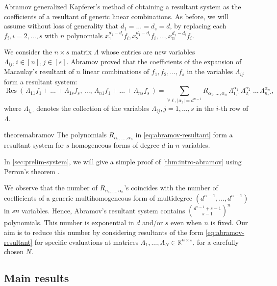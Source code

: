 \documentclass[11pt,a4paper]{article}
\numberwithin{equation}{section}
\newcommand{\KK}{\mathbb{K}}
\DeclareMathOperator{\Res}{Res}
\begin{document}
Abramov \cite{Abramov-13} generalized Kapferer's method of obtaining a resultant system as the coefficients of a resultant of generic linear combinations.
As before, we will assume without loss of generality that $d_1=\dots=d_s=d$, by replacing each $f_i, i=2,\dots,s$ with $n$ polynomials $x_1^{d_1-d_i}f_i, x_2^{d_1-d_i}f_i,\dots, x_n^{d_1-d_i}f_i$.  

We consider the $n\times s$ matrix $\Lambda$ whose entries are new variables $\Lambda_{ij}, i\in [n], j\in [s]$. 
Abramov proved that the coefficients of the expansion of Macaulay's resultant of $n$ linear combinations of $f_1,f_2,\dots,f_s$ in the variables $\Lambda_{ij}$ form a resultant system:
\begin{equation}
\label{eq:abramov-resultant}
    \Res\left(\, \Lambda_{11}f_1 + \dots + \Lambda_{1s}f_s ,\, \dots ,\, \Lambda_{n1}f_1 + \dots + \Lambda_{ns} f_s \,\right) = \sum_{\forall \ell, |\alpha_\ell|=d^{n-1}} R_{\alpha_1,\dots,\alpha_n} \, \Lambda_{1,\cdot}^{\alpha_1}\, \Lambda_{2,\cdot}^{\alpha_2}\,\dots\,\Lambda_{n,\cdot}^{\alpha_n},
\end{equation} 
where $\Lambda_{i,\cdot}$ denotes the collection of the variables $\Lambda_{ij}, j=1,\dots,s$ in the $i$-th row of $\Lambda$.

\begin{restatable}{theorem}{abramov}
\label{thm:intro-abramov}
    The polynomials $R_{\alpha_1,\dots,\alpha_n}$ in \eqref{eq:abramov-resultant} form a resultant system for $s$ homogeneous forms of degree $d$ in $n$ variables.
\end{restatable}
\noindent
In \cref{sec:prelim-system}, we will give a simple proof of \cref{thm:intro-abramov} using Perron's theorem \cite{Perron-41}.

We observe that the number of $R_{\alpha_1,\dots,\alpha_n}$'s coincides with the number of coefficients of a generic multihomogeneous form of multidegree $(d^{n-1},\dots,d^{n-1})$ in $sn$ variables.
Hence, Abramov's resultant system contains $\binom{d^{n-1}+s-1}{s-1}^{n}$ polynomials.
This number is exponential in $d$ and/or $s$ even when $n$ is fixed.
Our aim is to reduce this number by considering resultants of the form \eqref{eq:abramov-resultant} for specific evaluations at matrices $\Lambda_1,\dots,\Lambda_N\in\KK^{n\times s}$, for a carefully chosen $N$.


\subsection{Main results}
\label{sec:main-results}
\end{document}
